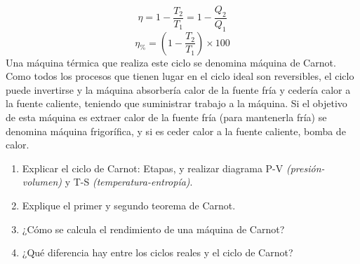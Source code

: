 \documentclass[../main]{subfiles}
\begin{document}
\begin{equation}
  \eta =1-{\frac {T_{2}}{T_{1}}}=1-{\frac {Q_{2}}{Q_{1}}}
\end{equation}
\begin{equation}
  \eta_{\%} =\left( 1-\frac {T_{2}}{T_{1}}\right)\times100
\end{equation}
Una máquina térmica que realiza este ciclo se denomina máquina de Carnot.
Como todos los procesos que tienen lugar en el ciclo ideal son
reversibles, el ciclo puede invertirse y la máquina absorbería calor
de la fuente fría y cedería calor a la fuente caliente, teniendo que
suministrar trabajo a la máquina. Si el objetivo de esta máquina es
extraer calor de la fuente fría (para mantenerla fría) se denomina
máquina frigorífica, y si es ceder calor a la fuente caliente, bomba de calor.
\begin{enumerate}
  \item Explicar el ciclo de Carnot: Etapas, y realizar diagrama P-V
    \emph{(presión-volumen)} y T-S \emph{(temperatura-entropía)}.
  \item Explique el primer y segundo teorema de Carnot.
  \item ¿Cómo se calcula el rendimiento de una máquina de Carnot?
  \item ¿Qué diferencia hay entre los ciclos reales y el ciclo de Carnot?
\end{enumerate}
\end{document}
